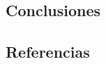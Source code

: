 \documentclass[final]{beamer}
\begin{document}
\begin{frame}[t]
\begin{multicols}{3}
\section{Conclusiones}



\subsection{Referencias}












\end{multicols}

\end{frame}
\end{document}
